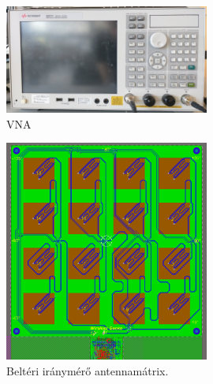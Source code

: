 \documentclass[a4paper,12pt,titlepage]{article}
\begin{document}
%
            \begin{figure}
                \centering
                \includegraphics[width=0.6\textwidth]{kep/szerkesztett/vna.jpg}
                \caption{VNA}
                \label{fig:vna}
            \end{figure}
%
%
            \begin{figure}
                \centering
                \includegraphics[width=0.6\textwidth]{kep/szerkesztett/antennamatrix.png}
                \caption{Beltéri iránymérő antennamátrix.}
                \label{fig:antennamatrix}
            \end{figure}
%
\end{document}
